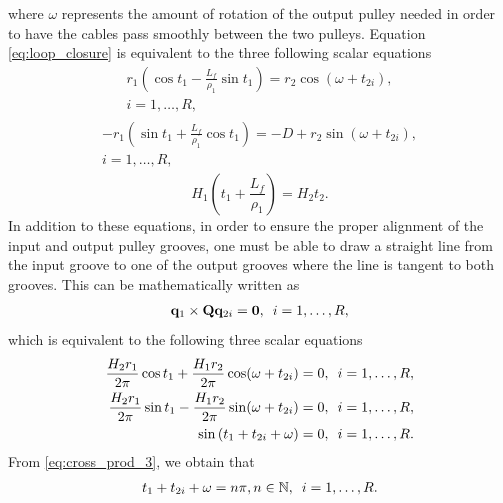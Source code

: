   where $\omega$ represents the amount of rotation of the output pulley needed in order to have the cables pass smoothly between the two pulleys.
  Equation \eqref{eq:loop_closure} is equivalent to the three following scalar equations
  \begin{equation}
  \begin{multlined}
      r_1\left(\cos t_1 -\frac{L_f}{\rho_1}\sin t_1\right)=r_2\cos\left(\omega+t_{2i}\right),\\ i=1 ,\ldots , R,\label{eq:loop_closure_deriv1}
      \end{multlined}
      \end{equation}
      \begin{align}
      \begin{multlined}
      -r_1\left(\sin t_1 + \frac{L_f}{\rho_1}\cos t_1\right)=-D+r_2\sin\left(\omega+t_{2i}\right),\\ i=1 ,\ldots , R,\label{eq:loop_closure_deriv2}
      \end{multlined}
      \end{align}
      \begin{equation}
      H_1\left(t_1+\frac{L_f}{\rho_1}\right) = H_2t_2.\label{eq:loop_closure_deriv3}
  \end{equation}
  In addition to these equations, in order to ensure the proper alignment of the input and output pulley grooves, one must be able to draw a straight line from the input groove to one of the output grooves where the line is tangent to both grooves. This can be mathematically written as 
  \begin{align}
      \mathbf{q}_1 \times \mathbf{Q}\mathbf{q}_{2i} = \mathbf{0},\hspace{0.5em} i=1 ,\ldots , R,
  \end{align}
  which is equivalent to the following three scalar equations 
  \begin{align}
      \frac{H_2r_1}{2\pi}\cos t_1 + \frac{H_1r_2}{2\pi}\cos(\omega+t_{2i})=0,\hquad i=1 ,\ldots , R,\label{eq:cross_prod_1}\\
      \frac{H_2r_1}{2\pi}\sin t_1-\frac{H_1r_2}{2\pi}\sin(\omega + t_{2i})=0,\hquad i=1 ,\ldots , R,\label{eq:cross_prod_2}\\
      \sin\left(t_1+t_{2i}+\omega\right)=0,\hquad i=1 ,\ldots , R.\label{eq:cross_prod_3}
  \end{align}
From \eqref{eq:cross_prod_3}, we obtain that
\begin{align}
    t_1+t_{2i}+\omega = n\pi, n\in \mathbb{N},\hquad i = 1,\ldots ,R.\label{eq:cross_prod_deriv1}
\end{align}
